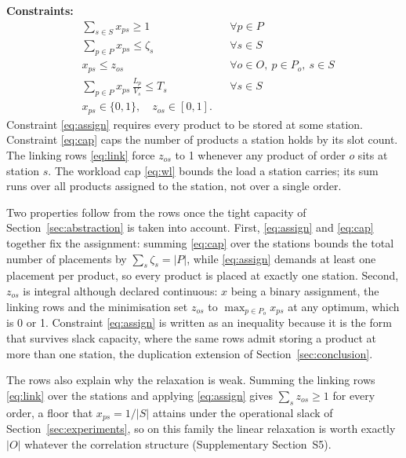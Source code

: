 \documentclass[]{interact}
\begin{document}
\noindent\textbf{Constraints:}
\begin{align}
& \sum_{s \in S} x_{ps} \ge 1 && \forall p \in P \label{eq:assign}\\
& \sum_{p \in P} x_{ps} \le \zeta_s && \forall s \in S \label{eq:cap}\\
& x_{ps} \le z_{os} && \forall o \in O,\ p \in P_o,\ s \in S \label{eq:link}\\
& \sum_{p \in P} x_{ps}\,\frac{L_p}{V_s} \le T_s && \forall s \in S \label{eq:wl}\\
& x_{ps} \in \{0,1\},\quad z_{os} \in [0,1]. && \label{eq:dom}
\end{align}
Constraint \eqref{eq:assign} requires every product to be stored at some station. Constraint \eqref{eq:cap} caps the number of products a station holds by its slot count. The linking rows \eqref{eq:link} force $z_{os}$ to 1 whenever any product of order $o$ sits at station $s$. The workload cap \eqref{eq:wl} bounds the load a station carries; its sum runs over all products assigned to the station, not over a single order.

Two properties follow from the rows once the tight capacity of Section~\ref{sec:abstraction} is taken into account. First, \eqref{eq:assign} and \eqref{eq:cap} together fix the assignment: summing \eqref{eq:cap} over the stations bounds the total number of placements by $\sum_s \zeta_s = |P|$, while \eqref{eq:assign} demands at least one placement per product, so every product is placed at exactly one station. Second, $z_{os}$ is integral although declared continuous: $x$ being a binary assignment, the linking rows and the minimisation set $z_{os}$ to $\max_{p \in P_o} x_{ps}$ at any optimum, which is 0 or 1. Constraint \eqref{eq:assign} is written as an inequality because it is the form that survives slack capacity, where the same rows admit storing a product at more than one station, the duplication extension of Section~\ref{sec:conclusion}.

The rows also explain why the relaxation is weak. Summing the linking rows \eqref{eq:link} over the stations and applying \eqref{eq:assign} gives $\sum_{s} z_{os}\ge 1$ for every order, a floor that $x_{ps}=1/|S|$ attains under the operational slack of Section~\ref{sec:experiments}, so on this family the linear relaxation is worth exactly $|O|$ whatever the correlation structure (Supplementary Section~S5).
\end{document}
